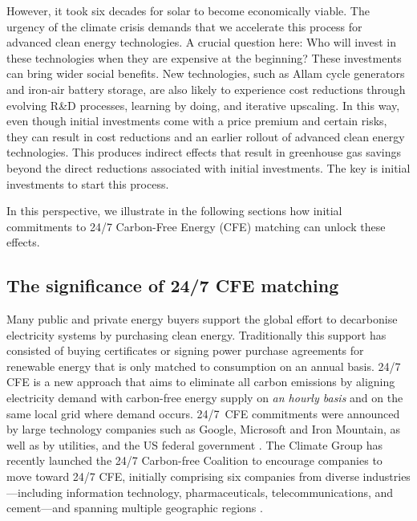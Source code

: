 \documentclass[pdflatex,sn-basic, Numbered]{sn-jnl}
\theoremstyle{thmstyleone}%
\theoremstyle{thmstyletwo}%
\theoremstyle{thmstylethree}%
\begin{document}
However, it took six decades for solar to become economically viable. The urgency of the climate crisis demands that we accelerate this process for advanced clean energy technologies. A crucial question here: Who will invest in these technologies when they are expensive at the beginning? These investments can bring wider social benefits. New technologies, such as Allam cycle generators and iron-air battery storage, are also likely to experience cost reductions through evolving R\&D processes, learning by doing, and iterative upscaling. In this way, even though initial investments come with a price premium and certain risks, they can result in cost reductions and an earlier rollout of advanced clean energy technologies. This produces indirect effects that result in greenhouse gas savings beyond the direct reductions associated with initial investments. The key is initial investments to start this process.

In this perspective, we illustrate in the following sections how initial commitments to 24/7 Carbon-Free Energy (CFE) matching can unlock these effects.

\subsection*{The significance of 24/7 CFE matching}\label{sec2}

Many public and private energy buyers support the global effort to decarbonise electricity systems by purchasing clean energy.
Traditionally this support has consisted of buying certificates or signing power purchase agreements for renewable energy that is only matched to consumption on an annual basis. 24/7 CFE is a new approach that aims to eliminate all carbon emissions by aligning electricity demand with carbon-free energy supply on \textit{an hourly basis} and on the same local grid where demand occurs.
24/7~CFE commitments were announced by large technology companies such as Google, Microsoft and Iron Mountain, as well as by utilities, and the US federal government \cite{gocarbonfree247}. The Climate Group has recently launched the 24/7 Carbon-free Coalition to encourage companies to move toward 24/7 CFE, initially comprising six companies from diverse industries---including information technology, pharmaceuticals, telecommunications, and cement---and spanning multiple geographic regions \cite{climategroup247CarbonFree2024}.
\end{document}

